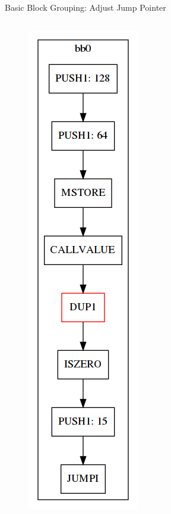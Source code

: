 \documentclass[11pt]{beamer}
\begin{document}
\begin{frame}{Basic Block Grouping: Adjust Jump Pointer}
\begin{columns}
{\begin{figure}
        \includegraphics[scale=0.25]{figures/stack/cfg_stack5.png}
    \end{figure}
}
\end{columns}
\end{frame}
\end{document}
